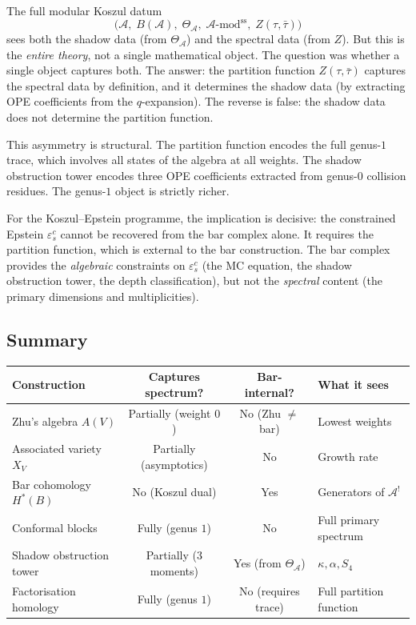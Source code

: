 \documentclass[11pt]{article}
\newcommand{\cA}{\mathcal{A}}
\begin{document}
The full modular Koszul datum
\[
\bigl(\cA,\; B(\cA),\; \Theta_\cA,\;
\cA\text{-}\mathrm{mod}^{\mathrm{ss}},\;
Z(\tau,\bar\tau)\bigr)
\]
sees both the shadow data (from $\Theta_\cA$) and the spectral
data (from $Z$).  But this is the \emph{entire theory}, not a
single mathematical object.  The question was whether a single
object captures both.  The answer: the partition function
$Z(\tau,\bar\tau)$ captures the spectral data by definition,
and it determines the shadow data (by extracting OPE coefficients
from the $q$-expansion).  The reverse is false: the shadow data
does not determine the partition function.

This asymmetry is structural.  The partition function encodes
the full genus-$1$ trace, which involves all states of the
algebra at all weights.  The shadow obstruction tower encodes three OPE
coefficients extracted from genus-$0$ collision residues.  The
genus-$1$ object is strictly richer.

For the Koszul--Epstein programme, the implication is decisive:
the constrained Epstein $\varepsilon^c_s$ cannot be recovered
from the bar complex alone.  It requires the partition function,
which is external to the bar construction.  The bar complex
provides the \emph{algebraic} constraints on $\varepsilon^c_s$
(the MC equation, the shadow obstruction tower, the depth classification),
but not the \emph{spectral} content (the primary dimensions and
multiplicities).

\subsection{Summary}

\begin{center}
\small
\renewcommand{\arraystretch}{1.3}
\begin{tabular}{@{}lccl@{}}
\textbf{Construction} & \textbf{Captures spectrum?} & \textbf{Bar-internal?}
  & \textbf{What it sees} \\
\hline
Zhu's algebra $A(V)$ & Partially (weight $0$)
  & No (Zhu $\neq$ bar) & Lowest weights \\
Associated variety $X_V$ & Partially (asymptotics)
  & No & Growth rate \\
Bar cohomology $H^*(B)$ & No (Koszul dual)
  & Yes & Generators of $\cA^!$ \\
Conformal blocks & Fully (genus $1$)
  & No & Full primary spectrum \\
Shadow obstruction tower & Partially ($3$ moments)
  & Yes (from $\Theta_\cA$) & $\kappa, \alpha, S_4$ \\
Factorisation homology & Fully (genus $1$)
  & No (requires trace) & Full partition function
\end{tabular}
\end{center}
\end{document}

